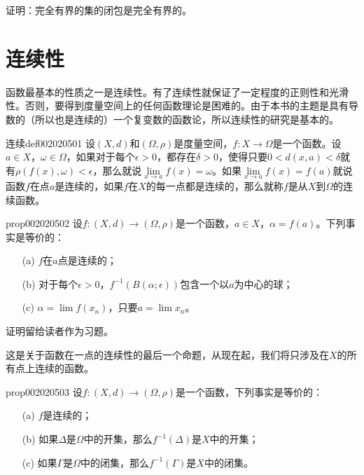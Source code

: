\begin{exercise}
证明：完全有界的集的闭包是完全有界的。
\end{exercise}



\section{连续性}\label{section0020205}
函数最基本的性质之一是连续性。有了连续性就保证了一定程度的正则性和光滑性。否则，要得到度量空间上的任何函数理论是困难的。由于本书的主题是具有导数的（所以也是连续的）一个复变数的函数论，所以连续性的研究是基本的。

\begin{definition}{连续}{def002020501}
设$(X, d)$和$(\Omega, \rho)$是度量空间，$f:X \to \Omega$是一个函数。设$a \in X$，$\omega \in \Omega$，如果对于每个$\epsilon > 0$，都存在$\delta > 0$，使得只要$0 < d(x, a) < \delta$就有$\rho(f(x), \omega) < \epsilon$，那么就说$\lim\limits_{x \to a}{f(x)} = \omega$。如果$\lim\limits_{x \to a}{f(x)} = f(a)$就说函数$f$在点$a$是连续的，如果$f$在$X$的每一点都是连续的，那么就称$f$是从$X$到$\Omega$的连续函数。
\end{definition}

\begin{proposition}{}{prop002020502}
设$f: (X, d) \to (\Omega, \rho)$是一个函数，$a \in X$，$\alpha = f(a)$。下列事实是等价的：
\begin{enumerate}
\item[(a)]$f$在$a$点是连续的；
\item[(b)]对于每个$\epsilon > 0$，$f^{-1}(B(\alpha; \epsilon))$包含一个以$a$为中心的球；
\item[(c)]$\alpha = \lim{f(x_n)}$，只要$a = \lim{x_n}$。
\end{enumerate}
\end{proposition}

证明留给读者作为习题。

这是关于函数在一点的连续性的最后一个命题，从现在起，我们将只涉及在$X$的所有点上连续的函数。

\begin{proposition}{}{prop002020503}
设$f: (X, d) \to (\Omega, \rho)$是一个函数，下列事实是等价的：
\begin{enumerate}
\item[(a)]$f$是连续的；
\item[(b)]如果$\Delta$是$\Omega$中的开集，那么$f^{-1}(\Delta)$是$X$中的开集；
\item[(c)]如果$\Gamma$是$\Omega$中的闭集，那么$f^{-1}(\Gamma)$是$X$中的闭集。
\end{enumerate}
\end{proposition}

